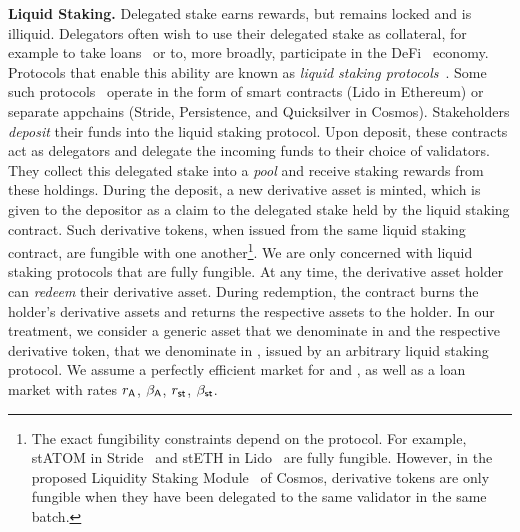 \noindent
\textbf{Liquid Staking.} Delegated stake earns rewards, but remains locked and
is illiquid. Delegators often wish to use their delegated stake as collateral,
for example to take loans~\cite{gudgeon2020defi} or to, more broadly, participate in the
DeFi~\cite{defi-sok} economy. Protocols that enable this ability are known as
\emph{liquid staking protocols}~\cite{liquid-staking-report}.
Some such protocols~\cite{lido,stride} operate
in the form of smart contracts (\eg Lido in Ethereum) or separate appchains
(\eg Stride, Persistence, and Quicksilver in Cosmos).
Stakeholders \emph{deposit} their funds into the liquid staking protocol.
Upon deposit, these contracts act as
delegators and delegate the incoming funds to their choice of validators.
They collect this delegated stake into a \emph{pool} and receive staking
rewards from these holdings.
During the deposit, a new derivative asset is minted,
which is given to the depositor as a claim to the delegated stake held by the
liquid staking contract. Such derivative tokens, when issued from the same liquid
staking contract, are fungible with one another\footnote{The exact fungibility
constraints depend on the protocol. For example,
\textsf{stATOM} in Stride~\cite{stride} and \textsf{stETH} in Lido~\cite{lido} are fully fungible.
However, in the proposed Liquidity Staking
Module~\cite{liquidity-staking-module} of Cosmos,
derivative tokens are only fungible when they have been
delegated to the same validator in the same batch.}. We are only concerned with liquid
staking protocols that are fully fungible. At any time, the derivative asset holder
can \emph{redeem} their derivative asset.
During redemption, the contract burns
the holder's derivative assets and returns the respective assets to the holder.
In our treatment, we consider a generic asset that we denominate in \asset
and the respective derivative token, that we denominate in \stasset,
issued by an arbitrary liquid staking protocol.
We assume a perfectly efficient market for \asset and \stasset,
as well as a loan market with rates
$r_{\textsf{A}}$, $\beta_{\textsf{A}}$, $r_{\textsf{st}}$, $\beta_{\textsf{st}}$.

